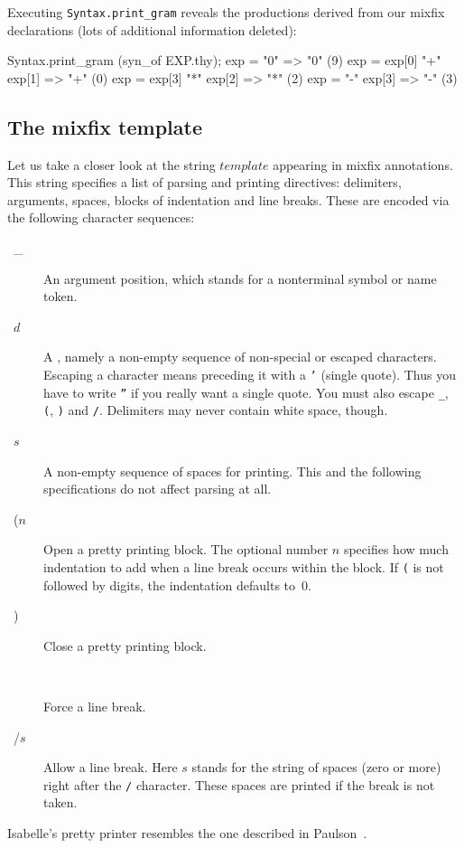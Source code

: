 Executing {\tt Syntax.print_gram} reveals the productions derived
from our mixfix declarations (lots of additional information deleted):
\begin{ttbox}
Syntax.print_gram (syn_of EXP.thy);
{\out exp = "0"  => "0" (9)}
{\out exp = exp[0] "+" exp[1]  => "+" (0)}
{\out exp = exp[3] "*" exp[2]  => "*" (2)}
{\out exp = "-" exp[3]  => "-" (3)}
\end{ttbox}


\subsection{The mixfix template}
Let us take a closer look at the string $template$ appearing in mixfix
annotations.  This string specifies a list of parsing and printing
directives: delimiters, arguments,
spaces, blocks of indentation and line breaks.  These are encoded via the
following character sequences:

\begin{description}
  \item[~\ttindex_~] An argument position, which
    stands for a nonterminal symbol or name token.

  \item[~$d$~] A , namely a non-empty sequence of
    non-special or escaped characters.  Escaping a character means preceding it with a {\tt '} (single quote).  Thus
    you have to write {\tt ''} if you really want a single quote.  You must
    also escape {\tt _}, {\tt (}, {\tt )} and {\tt /}.  Delimiters may
    never contain white space, though.

  \item[~$s$~] A non-empty sequence of spaces for printing.  This
    and the following specifications do not affect parsing at all.

  \item[~{\ttindex($n$}~] Open a pretty printing block.  The optional
    number $n$ specifies how much indentation to add when a line break
    occurs within the block.  If {\tt(} is not followed by digits, the
    indentation defaults to~$0$.

  \item[~\ttindex)~] Close a pretty printing block.

  \item[~\ttindex{//}~] Force a line break.

  \item[~\ttindex/$s$~] Allow a line break.  Here $s$ stands for the string
    of spaces (zero or more) right after the {\tt /} character.  These
    spaces are printed if the break is not taken.
\end{description}
Isabelle's pretty printer resembles the one described in
Paulson~\cite{paulson91}.  


